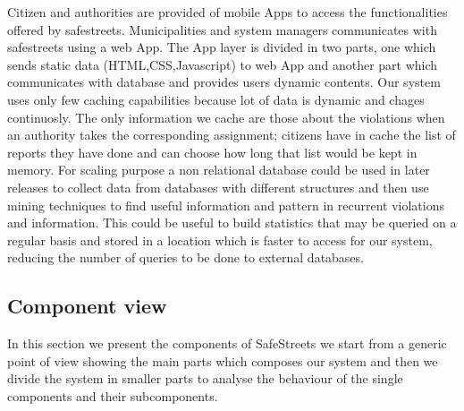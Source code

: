 Citizen and authorities are provided of mobile Apps to access the functionalities offered by safestreets. Municipalities and system managers communicates with safestreets using a web App.
The App layer is divided in two parts, one which sends static data (HTML,CSS,Javascript) to web App and another part which communicates with database and provides users dynamic contents.
Our system uses only few caching capabilities because lot of data is dynamic and chages continuosly. 
The only information we cache are those about the violations when an authority takes the corresponding assignment; citizens have in cache the list of reports they have done and can choose how long that list would be kept in memory.
For scaling purpose a non relational database could be used in later releases to collect data from databases with different structures and then use mining techniques to find useful information and pattern in recurrent violations and information. This could be useful to build statistics that may be queried on a regular basis and stored in a location which is faster to access for our system, reducing the number of queries to be done to external databases.


\subsection{Component view}
In this section we present the components of SafeStreets we start from a generic point of view showing the main parts which composes our system and then we divide the system in smaller parts to analyse the behaviour of the single components and their subcomponents.

